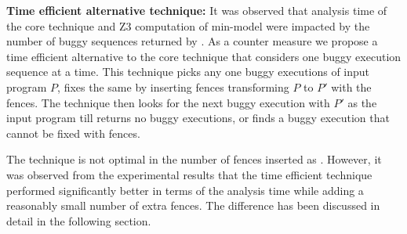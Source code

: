 {\bf Time efficient alternative technique:} It was observed that analysis
time of the core technique and Z3 computation of min-model were impacted
by the number of buggy sequences returned by \cds.
%
As a counter measure we propose a time efficient alternative to the core 
technique that considers one buggy execution sequence at a time.
%
This technique picks any one buggy executions of input program $P$,
fixes the same by inserting \sc fences transforming $P$ to $P'$ with the
\sc fences. The technique then looks for the next buggy execution with 
$P'$ as the input program till \cds returns no buggy executions, or
finds a buggy execution that cannot be fixed with \sc fences.

The technique is not optimal in the number of fences inserted as 
.
%
However, it was observed from the experimental results that the time
efficient technique performed significantly better in terms of the
analysis time while adding a reasonably small number of extra \sc
fences. The difference has been discussed in detail in the following 
section.